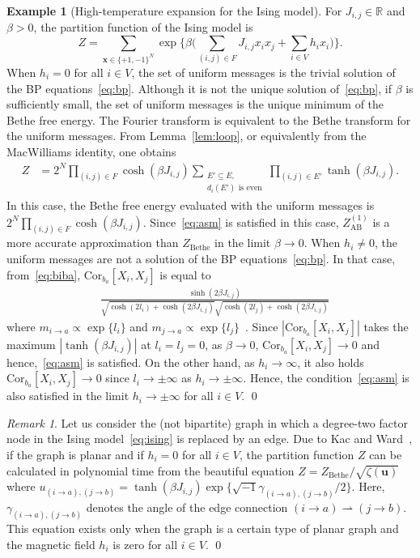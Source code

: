 \documentclass[a4paper,10pt,twoside,twocolumn,openany,final]{memoir}
\newcommand{\Cor}{\mathrm{Cor}}
\theoremstyle{plain}
\theoremstyle{definition}
\newtheorem{example}[theorem]{Example}
\theoremstyle{remark}
\newtheorem{remark}[theorem]{Remark}
\begin{document}
\begin{example}[High-temperature expansion for the Ising model]
For $J_{i,j}\in\mathbb{R}$ and $\beta>0$, the partition function of the Ising model is
\begin{equation}\label{eq:ising}
Z = \sum_{\bm{x}\in\{+1,-1\}^N}\exp\bigg\{\beta\bigg(\sum_{(i,j)\in F}J_{i,j}x_ix_j + \sum_{i\in V} h_i x_i\bigg) \bigg\}.
\end{equation}
When $h_i = 0$ for all $i\in V$, 
the set of uniform messages is the trivial solution of the BP equations~\eqref{eq:bp}.
Although it is not the unique solution of~\eqref{eq:bp},
if $\beta$ is sufficiently small, the set of uniform messages is the unique minimum of the Bethe free energy.
The Fourier transform is equivalent to the Bethe transform for the uniform messages.
From Lemma~\ref{lem:loop}, or equivalently from the MacWilliams identity,
one obtains
\begin{align*}
Z
&= 2^N\prod_{(i,j)\in F}\cosh(\beta J_{i,j})
\sum_{\substack{E'\subseteq E,\\ d_i(E') \text{ is even}}}\prod_{(i,j)\in E'}\tanh(\beta J_{i,j}).
\end{align*}
In this case, the Bethe free energy evaluated with the uniform messages is $2^N\prod_{(i,j)\in F} \cosh(\beta J_{i,j})$.
Since~\eqref{eq:asm} is satisfied in this case, $Z_{\mathrm{AB}}^{(1)}$ is a more accurate approximation than $Z_\mathrm{Bethe}$
in the limit $\beta\to 0$.
When $h_i\ne 0$, the uniform messages are not a solution of the BP equations~\eqref{eq:bp}.
In that case, from~\eqref{eq:biba},
$\Cor_{b_a}[X_i, X_j]$ is equal to
\begin{align*}
&\frac{\sinh(2\beta J_{i,j})}{\sqrt{\cosh(2l_i) + \cosh(2\beta J_{i,j})}\sqrt{\cosh(2l_j) + \cosh(2\beta J_{i,j})}}
\end{align*}
where $m_{i\to a}\propto \exp\{l_i\}$ and $m_{j\to a}\propto \exp\{l_j\}$~\cite{watanabe2010thesis}.
Since $|\Cor_{b_a}[X_i, X_j]|$ takes the maximum $|\tanh(\beta J_{i,j})|$ at $l_i=l_j=0$,
as $\beta\to 0$, $\Cor_{b_a}[X_i, X_j]\to 0$ and hence,~\eqref{eq:asm} is satisfied.
On the other hand, as $h_i\to\infty$, it also holds $\Cor_{b_a}[X_i, X_j]\to 0$ since $l_i\to\pm\infty$ as $h_i\to\pm\infty$.
Hence, the condition~\eqref{eq:asm} is also satisfied in the limit $h_i\to\pm\infty$ for all $i\in V$.
\hfill\qed
\end{example}
\begin{remark}
Let us consider the (not bipartite) graph in which a degree-two factor node in the Ising model~\eqref{eq:ising} is replaced by an edge.
Due to Kac and Ward~\cite{kac1952combinatorial},
if the graph is planar and if $h_i=0$ for all $i\in V$, the partition function $Z$ can be calculated in polynomial time from the beautiful equation
$Z=Z_{\mathrm{Bethe}}/\sqrt{\zeta(\bm{u})}$
where $u_{(i\to a), (j\to b)}=\tanh(\beta J_{i,j})\exp\{\sqrt{-1}\gamma_{(i\to a), (j\to b)}/2\}$.
Here, $\gamma_{(i\to a), (j\to b)}$ denotes the angle of the edge connection $(i\to a)\rightharpoonup (j\to b)$.
This equation exists only when the graph is a certain type of planar graph and the magnetic field $h_i$ is zero for all $i\in V$.
\hfill \qed
\end{remark}
\end{document}
